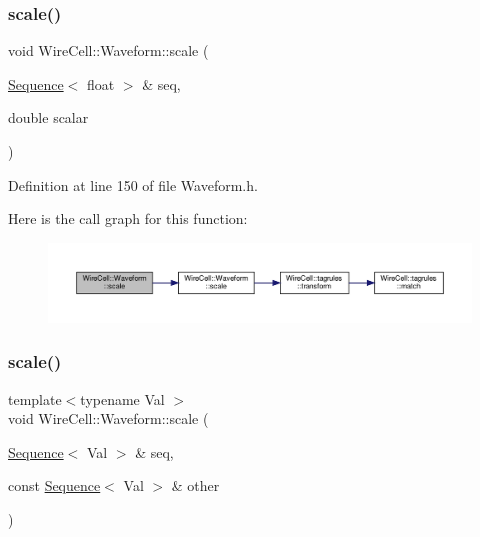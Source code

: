\subsubsection{\texorpdfstring{scale()}{scale()}\hspace{0.1cm}{\footnotesize\ttfamily [2/3]}}
{\footnotesize\ttfamily void Wire\+Cell\+::\+Waveform\+::scale (\begin{DoxyParamCaption}\item[{\hyperlink{namespace_wire_cell_1_1_waveform_a1d2a1b672e3b220dcd64a994531de95d}{Sequence}$<$ float $>$ \&}]{seq,  }\item[{double}]{scalar }\end{DoxyParamCaption})\hspace{0.3cm}{\ttfamily [inline]}}



Definition at line 150 of file Waveform.\+h.

Here is the call graph for this function\+:
\nopagebreak
\begin{figure}[H]
\begin{center}
\leavevmode
\includegraphics[width=350pt]{namespace_wire_cell_1_1_waveform_a3278b47bbecdbb8a663286d9cdec0d75_cgraph}
\end{center}
\end{figure}
\mbox{\label{namespace_wire_cell_1_1_waveform_a6eea0e61cd0999be1219fd0d504e3b13}} 
\subsubsection{\texorpdfstring{scale()}{scale()}\hspace{0.1cm}{\footnotesize\ttfamily [3/3]}}
{\footnotesize\ttfamily template$<$typename Val $>$ \\
void Wire\+Cell\+::\+Waveform\+::scale (\begin{DoxyParamCaption}\item[{\hyperlink{namespace_wire_cell_1_1_waveform_a1d2a1b672e3b220dcd64a994531de95d}{Sequence}$<$ Val $>$ \&}]{seq,  }\item[{const \hyperlink{namespace_wire_cell_1_1_waveform_a1d2a1b672e3b220dcd64a994531de95d}{Sequence}$<$ Val $>$ \&}]{other }\end{DoxyParamCaption})}



